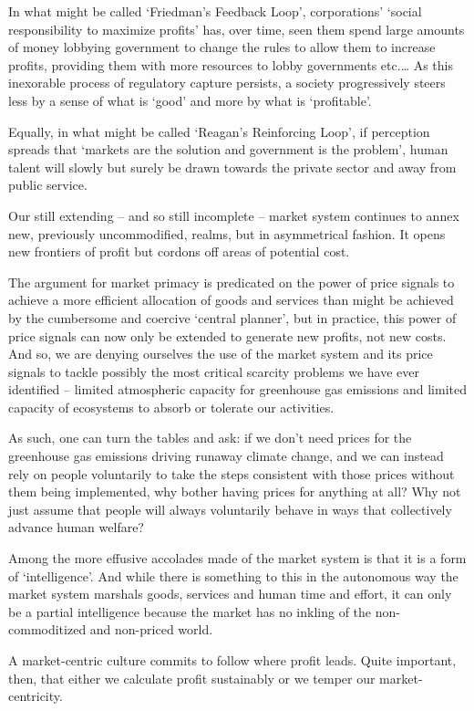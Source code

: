 \documentclass[
]{book}
\begin{document}
In what might be called `Friedman's Feedback Loop', corporations' `social responsibility to maximize
profits' has, over time, seen them spend large amounts of money lobbying government to change the
rules to allow them to increase profits, providing them with more resources to lobby governments
etc.\ldots{} As this inexorable process of regulatory capture persists, a society progressively steers less by a
sense of what is `good' and more by what is `profitable'.

Equally, in what might be called `Reagan's Reinforcing Loop', if perception spreads that `markets are
the solution and government is the problem', human talent will slowly but surely be drawn towards
the private sector and away from public service.

Our still extending -- and so still incomplete -- market system continues to annex new, previously
uncommodified, realms, but in asymmetrical fashion. It opens new frontiers of profit but cordons off
areas of potential cost.

The argument for market primacy is predicated on the power of price signals to achieve a more
efficient allocation of goods and services than might be achieved by the cumbersome and coercive
`central planner', but in practice, this power of price signals can now only be extended to generate
new profits, not new costs. And so, we are denying ourselves the use of the market system and its
price signals to tackle possibly the most critical scarcity problems we have ever identified -- limited
atmospheric capacity for greenhouse gas emissions and limited capacity of ecosystems to absorb or
tolerate our activities.

As such, one can
turn the tables and ask: if we don't need prices for the greenhouse gas emissions driving runaway
climate change, and we can instead rely on people voluntarily to take the steps consistent with those
prices without them being implemented, why bother having prices for anything at all? Why not just
assume that people will always voluntarily behave in ways that collectively advance human welfare?

Among the more effusive accolades made of the market system is that it is a form of `intelligence'.
And while there is something to this in the autonomous way the market system marshals goods,
services and human time and effort, it can only be a partial intelligence because the market has no
inkling of the non-commoditized and non-priced world.

A market-centric culture commits to follow where profit leads. Quite important, then, that either we
calculate profit sustainably or we temper our market-centricity.
\end{document}
